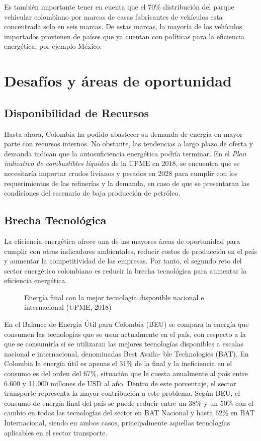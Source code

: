 Es también importante tener en cuenta que el 70\% distribución del parque vehicular colombiano por marcas de casas fabricantes de vehículos esta concentrada solo en seis marcas. De estas marcas, la mayoría de los vehículos importados provienen de países que ya cuentan con políticas para la eficiencia energética, por ejemplo México. 

\section{Desafíos y áreas de oportunidad}

\subsection{Disponibilidad de Recursos}

Hasta ahora, Colombia ha podido abastecer su demanda de energía en mayor parte con recursos internos. No obstante, las tendencias a largo plazo de oferta y demanda indican que la autosuficiencia energética podría terminar. En el \textit{Plan indicativo de combustibles líquidos} de la UPME en 2018, se encuentra que se necesitaría importar crudos livianos y pesados en 2028 para cumplir con los requerimientos de las refinerías y la demanda, en caso de que se presentaran las condiciones del escenario de baja producción de petróleo.


\subsection{Brecha Tecnológica}

La eficiencia energética ofrece una de las mayores áreas de oportunidad para cumplir con otros indicadores ambientales, reducir costos de producción en el país y aumentar la competitividad de las empresas. Por tanto, el segundo reto del sector energético colombiano es reducir la brecha tecnológica para aumentar la eficiencia energética.

 \begin{figure}[htbp]
   \centering
   
    \caption{Energía final con la mejor tecnología disponible nacional e internacional (UPME, 2018)}
    \label{fig:pn-sectores}
\end{figure}

En el Balance de Energía Útil para Colombia (BEU) se compara la energía que consumen las tecnologías que se usan actualmente en el país, con respecto a la que se consumiría si se utilizaran las mejores tecnologías disponibles a escalas nacional e internacional, denominadas Best Availa- ble Technologies (BAT). En Colombia la energía útil es apenas el 31\% de la final y la ineficiencia en el consumo es del orden del 67\%, situación que le cuesta anualmente al país entre 6.600 y 11.000 millones de USD al año. Dentro de este porcentaje, el sector transporte representa la mayor contribución a este problema. Según BEU, el consumo de energía final del país se puede reducir entre un 38\% y un 50\% con el cambio en todas las tecnologías del sector en BAT Nacional y hasta 62\% en BAT Internacional, siendo en ambos casos, principalmente aquellas tecnologías aplicables en el sector transporte.

